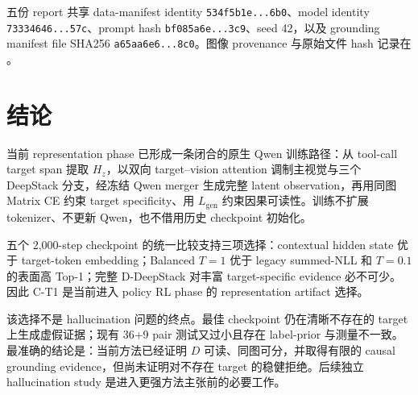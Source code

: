 \documentclass[UTF8,twocolumn,10pt,a4paper]{ctexart}
\newcommand{\code}[1]{\texttt{#1}}
\begin{document}
五份 report 共享 data-manifest identity \code{534f5b1e...6b0}、model identity \code{73334646...57c}、prompt hash \code{bf085a6e...3c9}、seed 42，以及 grounding manifest file SHA256 \code{a65aa6e6...8c0}。图像 provenance 与原始文件 hash 记录在 。

\section{结论}
当前 representation phase 已形成一条闭合的原生 Qwen 训练路径：从 tool-call target span 提取 $H_z$，以双向 target--vision attention 调制主视觉与三个 DeepStack 分支，经冻结 Qwen merger 生成完整 latent observation，再用同图 Matrix CE 约束 target specificity、用 $L_{\mathrm{gen}}$ 约束因果可读性。训练不扩展 tokenizer、不更新 Qwen，也不借用历史 checkpoint 初始化。

五个 2,000-step checkpoint 的统一比较支持三项选择：contextual hidden state 优于 target-token embedding；Balanced $T=1$ 优于 legacy summed-NLL 和 $T=0.1$ 的表面高 Top-1；完整 D-DeepStack 对丰富 target-specific evidence 必不可少。因此 C-T1 是当前进入 policy RL phase 的 representation artifact 选择。

该选择不是 hallucination 问题的终点。最佳 checkpoint 仍在清晰不存在的 target 上生成虚假证据；现有 36+9 pair 测试又过小且存在 label-prior 与测量不一致。最准确的结论是：当前方法已经证明 $D$ 可读、同图可分，并取得有限的 causal grounding evidence，但尚未证明对不存在 target 的稳健拒绝。后续独立 hallucination study 是进入更强方法主张前的必要工作。
\end{document}

